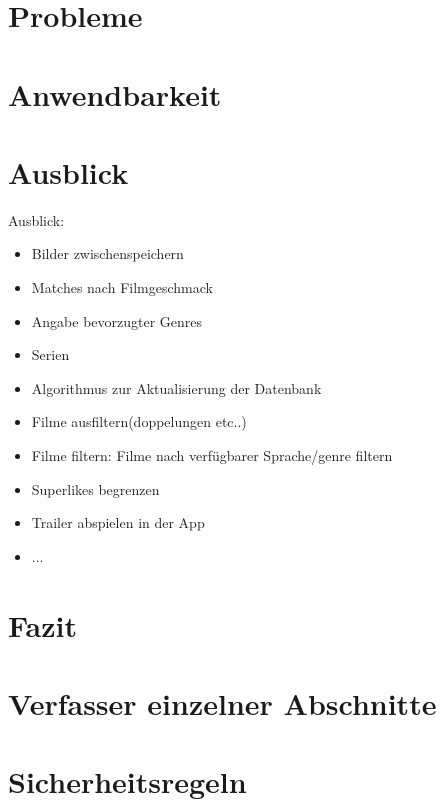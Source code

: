 \documentclass[11pt,a4paper]{article}
\begin{document}
\clearpage
\section{Probleme}
\label{sec:probleme}



\clearpage
\section{Anwendbarkeit}
\label{sec:anwendbarkeit}



\clearpage
\section{Ausblick}
Ausblick:
\begin{itemize}
\item Bilder zwischenspeichern
\item Matches nach Filmgeschmack
\item Angabe bevorzugter Genres
\item Serien
\item Algorithmus zur Aktualisierung der Datenbank
\item Filme ausfiltern(doppelungen etc..)
\item Filme filtern: Filme nach verfügbarer Sprache/genre filtern
\item Superlikes begrenzen
\item Trailer abspielen in der App
\item ...
\end{itemize}
\label{sec:ausblick}



\clearpage
\section{Fazit}
\label{sec:fazit}



\clearpage
\appendix
\section{Verfasser einzelner Abschnitte}

\clearpage
\section{Sicherheitsregeln}

\clearpage

\end{document}
